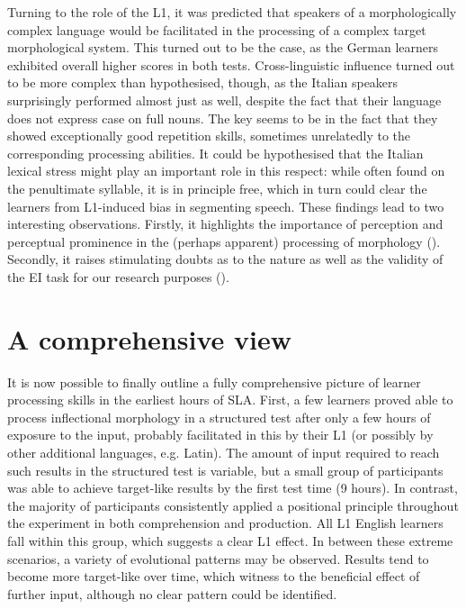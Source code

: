 Turning to the role of the L1, it was predicted that speakers of a morphologically complex language would be facilitated in the processing of a complex target morphological system. This turned out to be the case, as the German learners exhibited overall higher scores in both tests. Cross-linguistic influence turned out to be more complex than hypothesised, though, as the Italian speakers surprisingly performed almost just as well, despite the fact that their language does not express case on full nouns. The key seems to be in the fact that they showed exceptionally good repetition skills, sometimes unrelatedly to the corresponding processing abilities. It could be hypothesised that the Italian lexical stress might play an important role in this respect: while often found on the penultimate syllable, it is in principle free, which in turn could clear the learners from L1-induced bias in segmenting speech. These findings lead to two interesting observations. Firstly, it highlights the importance of perception and perceptual prominence in the (perhaps apparent) processing of morphology (\citealt{GallimoreTharp1981, Peters1985}). Secondly, it raises stimulating doubts as to the nature as well as the validity of the EI task for our research purposes (\citealt{Vinther2002, Erlam2006, VanMoere2012}).

\section{A comprehensive view}\label{sec:09:1}

It is now possible to finally outline a fully comprehensive picture of learner processing skills in the earliest hours of SLA. First, a few learners proved able to process inflectional morphology in a structured test after only a few hours of exposure to the input, probably facilitated in this by their L1 (or possibly by other additional languages, e.g. Latin). The amount of input required to reach such results in the structured test is variable, but a small group of participants was able to achieve target-like results by the first test time (9 hours). In contrast, the majority of participants consistently applied a positional principle throughout the experiment in both comprehension and production. All L1 English learners fall within this group, which suggests a clear L1 effect. In between these extreme scenarios, a variety of evolutional patterns may be observed. Results tend to become more target-like over time, which witness to the beneficial effect of further input, although no clear pattern could be identified.


